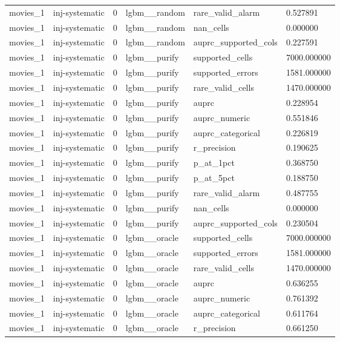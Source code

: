 \begin{tabular}{llllll}
movies\_1 & inj-systematic & 0 & lgbm\_\_random & rare\_valid\_alarm & 0.527891 \\
movies\_1 & inj-systematic & 0 & lgbm\_\_random & nan\_cells & 0.000000 \\
movies\_1 & inj-systematic & 0 & lgbm\_\_random & auprc\_supported\_cols & 0.227591 \\
movies\_1 & inj-systematic & 0 & lgbm\_\_purify & supported\_cells & 7000.000000 \\
movies\_1 & inj-systematic & 0 & lgbm\_\_purify & supported\_errors & 1581.000000 \\
movies\_1 & inj-systematic & 0 & lgbm\_\_purify & rare\_valid\_cells & 1470.000000 \\
movies\_1 & inj-systematic & 0 & lgbm\_\_purify & auprc & 0.228954 \\
movies\_1 & inj-systematic & 0 & lgbm\_\_purify & auprc\_numeric & 0.551846 \\
movies\_1 & inj-systematic & 0 & lgbm\_\_purify & auprc\_categorical & 0.226819 \\
movies\_1 & inj-systematic & 0 & lgbm\_\_purify & r\_precision & 0.190625 \\
movies\_1 & inj-systematic & 0 & lgbm\_\_purify & p\_at\_1pct & 0.368750 \\
movies\_1 & inj-systematic & 0 & lgbm\_\_purify & p\_at\_5pct & 0.188750 \\
movies\_1 & inj-systematic & 0 & lgbm\_\_purify & rare\_valid\_alarm & 0.487755 \\
movies\_1 & inj-systematic & 0 & lgbm\_\_purify & nan\_cells & 0.000000 \\
movies\_1 & inj-systematic & 0 & lgbm\_\_purify & auprc\_supported\_cols & 0.230504 \\
movies\_1 & inj-systematic & 0 & lgbm\_\_oracle & supported\_cells & 7000.000000 \\
movies\_1 & inj-systematic & 0 & lgbm\_\_oracle & supported\_errors & 1581.000000 \\
movies\_1 & inj-systematic & 0 & lgbm\_\_oracle & rare\_valid\_cells & 1470.000000 \\
movies\_1 & inj-systematic & 0 & lgbm\_\_oracle & auprc & 0.636255 \\
movies\_1 & inj-systematic & 0 & lgbm\_\_oracle & auprc\_numeric & 0.761392 \\
movies\_1 & inj-systematic & 0 & lgbm\_\_oracle & auprc\_categorical & 0.611764 \\
movies\_1 & inj-systematic & 0 & lgbm\_\_oracle & r\_precision & 0.661250 \\

\end{tabular}
